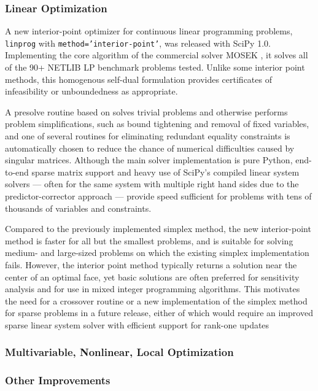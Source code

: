 \subsubsection{Linear Optimization}

A new interior-point optimizer for continuous linear programming problems, \texttt{linprog} with \texttt{method='interior-point'}, was released with SciPy 1.0. Implementing the core algorithm of the commercial solver MOSEK \cite{andersen2000mosek}, it solves all of the 90+ NETLIB LP benchmark problems \cite{netlib} tested. Unlike some interior point methods, this homogenous self-dual formulation provides certificates of infeasibility or unboundedness as appropriate. 

A presolve routine based on \cite{andersen1995presolving} solves trivial problems and otherwise performs problem simplifications, such as bound tightening and removal of fixed variables, and one of several routines for eliminating redundant equality constraints is automatically chosen to reduce the chance of numerical difficulties caused by singular matrices. Although the main solver implementation is pure Python, end-to-end sparse matrix support and heavy use of SciPy's compiled linear system solvers --- often for the same system with multiple right hand sides due to the predictor-corrector approach --- provide speed sufficient for problems with tens of thousands of variables and constraints.

Compared to the previously implemented simplex method, the new interior-point method is faster for all but the smallest problems, and is suitable for solving medium- and large-sized problems on which the existing simplex implementation fails. However, the interior point method typically returns a solution near the center of an optimal face, yet basic solutions are often preferred for sensitivity analysis and for use in mixed integer programming algorithms. This motivates the need for a crossover routine or a new implementation of the simplex method for sparse problems in a future release, either of which would require an improved sparse linear system solver with efficient support for rank-one updates

\subsubsection{Multivariable, Nonlinear, Local Optimization}


\subsubsection{Other Improvements}

